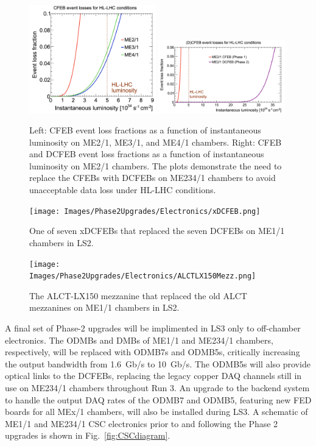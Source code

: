 \begin{figure}[H]
    \centering
    {\includegraphics[width=0.49\textwidth]{Images/Phase2Upgrades/Electronics/CFEBeventlosses.png}}
    {\includegraphics[width=0.49\textwidth]{Images/Phase2Upgrades/Electronics/DCFEBenetlosses.png}}
    \caption{Left: CFEB event loss fractions as a function of instantaneous luminosity on ME2/1, ME3/1, and ME4/1 chambers. Right: CFEB and DCFEB event loss fractions as a function of instantaneous luminosity on ME2/1 chambers. The plots demonstrate the need to replace the CFEBs with DCFEBs on ME234/1 chambers to avoid unacceptable data loss under HL-LHC conditions.}
    \label{fig:EventLosses}
\end{figure}

\begin{figure}[H]
    \centering
    {\texttt{[image: Images/Phase2Upgrades/Electronics/xDCFEB.png]}}
    \caption{One of seven xDCFEBs that replaced the seven DCFEBs on ME1/1 chambers in LS2.}
    \label{fig:xDCFEB}
\end{figure}

\begin{figure}[H]
    \centering
    {\texttt{[image: Images/Phase2Upgrades/Electronics/ALCTLX150Mezz.png]}}
    \caption{The ALCT-LX150 mezzanine that replaced the old ALCT mezzanines on ME1/1 chambers in LS2.}
    \label{fig:ALCT}
\end{figure}


A final set of Phase-2 upgrades will be implimented in LS3 only to off-chamber electronics. The ODMBs and DMBs of ME1/1 and ME234/1 chambers, respectively, will be replaced with ODMB7s and ODMB5s, critically increasing the output bandwidth from \SI{1.6}{Gb/s} to \SI{10}{Gb/s}. The ODMB5s will also provide optical links to the DCFEBs, replacing the legacy copper DAQ channels still in use on ME234/1 chambers throughout Run 3. An upgrade to the backend system to handle the output DAQ rates of the ODMB7 and ODMB5, featuring new FED boards for all MEx/1 chambers, will also be installed during LS3. A schematic of ME1/1 and ME234/1 CSC electronics prior to and following the Phase 2 upgrades is shown in Fig.~\ref{fig:CSCdiagram}.

